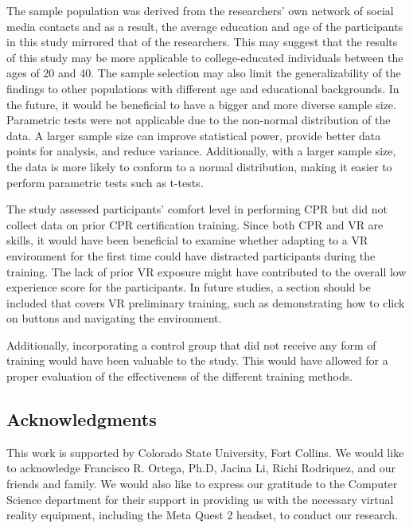 \documentclass[manuscript]{./Models/acmart}
\begin{document}
The sample population was derived from the researchers' own network of social media contacts and as a result, the average education and age of the participants in this study mirrored that of the researchers. This may suggest that the results of this study may be more applicable to college-educated individuals between the ages of 20 and 40. The sample selection may also limit the generalizability of the findings to other populations with different age and educational backgrounds. In the future, it would be beneficial to have a bigger and more diverse sample size. Parametric tests were not applicable due to the non-normal distribution of the data. A larger sample size can improve statistical power, provide better data points for analysis, and reduce variance. Additionally, with a larger sample size, the data is more likely to conform to a normal distribution, making it easier to perform parametric tests such as t-tests. 

The study assessed participants' comfort level in performing CPR but did not collect data on prior CPR certification training. Since both CPR and VR are skills, it would have been beneficial to examine whether adapting to a VR environment for the first time could have distracted participants during the training. The lack of prior VR exposure might have contributed to the overall low experience score for the participants. In future studies, a section should be included that covers VR preliminary training, such as demonstrating how to click on buttons and navigating the environment.

Additionally, incorporating a control group that did not receive any form of training would have been valuable to the study. This would have allowed for a proper evaluation of the effectiveness of the different training methods.

\subsection{Acknowledgments}
This work is supported by Colorado State University, Fort Collins. We would like to acknowledge Francisco R. Ortega, Ph.D, Jacina Li, Richi Rodriquez, and our friends and family. We would also like to express our gratitude to the Computer Science department for their support in providing us with the necessary virtual reality equipment, including the Meta Quest 2 headset, to conduct our research.



\end{document}
